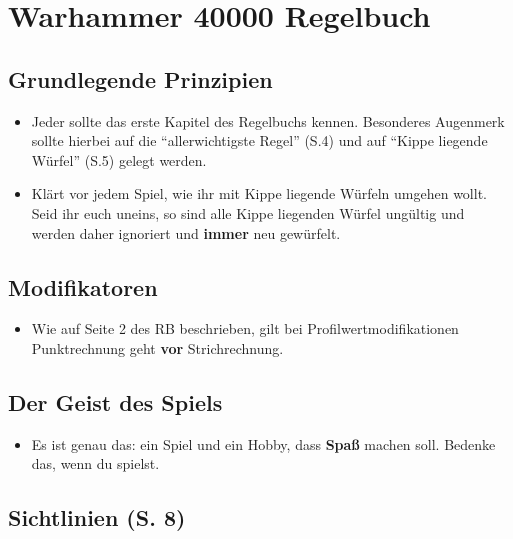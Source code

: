 \section{Warhammer 40000 Regelbuch}

\subsection{Grundlegende Prinzipien}

\begin{itemize}

 \item Jeder sollte das erste Kapitel des Regelbuchs kennen. Besonderes
  Augenmerk sollte hierbei auf die ``allerwichtigste Regel'' (S.4) und auf ``Kippe
  liegende Würfel'' (S.5) gelegt werden.

\item Klärt vor jedem Spiel, wie ihr mit Kippe liegende Würfeln umgehen wollt.
 Seid ihr euch uneins, so sind alle Kippe liegenden Würfel ungültig und werden
 daher ignoriert und \textbf{immer} neu gewürfelt.

\end{itemize}

\subsection{Modifikatoren}

\begin{itemize}

 \item Wie auf Seite 2 des RB beschrieben, gilt bei Profilwertmodifikationen
  Punktrechnung geht \textbf{vor} Strichrechnung.

\end{itemize}

\subsection{Der Geist des Spiels}

\begin{itemize}

 \item Es ist genau das: ein Spiel und ein Hobby, dass \textbf{Spaß} machen
  soll.  Bedenke das, wenn du spielst.

\end{itemize}

\subsection{Sichtlinien (S. 8)}

